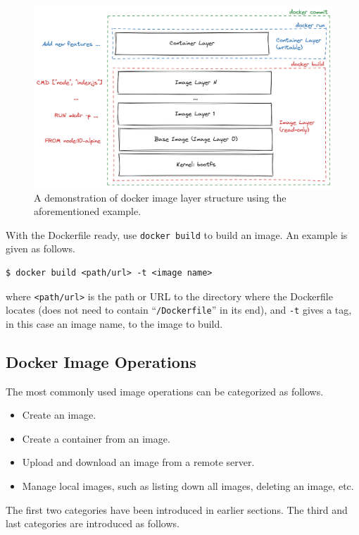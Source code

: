 \begin{figure}
	\centering
	\includegraphics[width=350pt]{chapters/ch-virtualization-and-containerization/figures/dockerlayerdemo.png}
	\caption{A demonstration of docker image layer structure using the aforementioned example.} \label{ch:vac:fig:dockerlayerdemo}
\end{figure}

With the Dockerfile ready, use \verb|docker build| to build an image. An example is given as follows.
\begin{lstlisting}
$ docker build <path/url> -t <image name>
\end{lstlisting}
where \verb|<path/url>| is the path or URL to the directory where the Dockerfile locates (does not need to contain ``\verb|/Dockerfile|'' in its end), and \verb|-t| gives a tag, in this case an image name, to the image to build.

\subsection{Docker Image Operations}

The most commonly used image operations can be categorized as follows.
\begin{itemize}
  \item Create an image.
  \item Create a container from an image.
  \item Upload and download an image from a remote server.
  \item Manage local images, such as listing down all images, deleting an image, etc.
\end{itemize}

The first two categories have been introduced in earlier sections. The third and last categories are introduced as follows.

